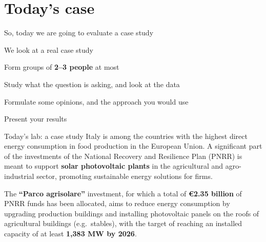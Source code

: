 \documentclass[aspectratio=169,xcolor=table]{beamer}
\begin{document}
\section{Today's case}

\begin{frame}{So, today we are going to evaluate a case study}
\be
  \item We look at a real case study
  \item Form groups of \textbf{2--3 people} at most
  \item Study what the question is asking, and look at the data
  \item Formulate some opinions, and the approach you would use
  \item Present your results
\ee
\end{frame}

\begin{frame}{Today's lab: a case study}
\small
Italy is among the countries with the highest direct energy consumption in food production in the European Union. A significant part of the investments of the National Recovery and Resilience Plan (PNRR) is meant to support \textbf{solar photovoltaic plants} in the agricultural and agro-industrial sector, promoting sustainable energy solutions for firms.

\vspace{0.15cm}
The \textbf{``Parco agrisolare''} investment, for which a total of \textbf{€2.35 billion} of PNRR funds has been allocated, aims to reduce energy consumption by upgrading production buildings and installing photovoltaic panels on the roofs of agricultural buildings (e.g.\ stables), with the target of reaching an installed capacity of at least \textbf{1,383 MW by 2026}.
\end{frame}
\end{document}
